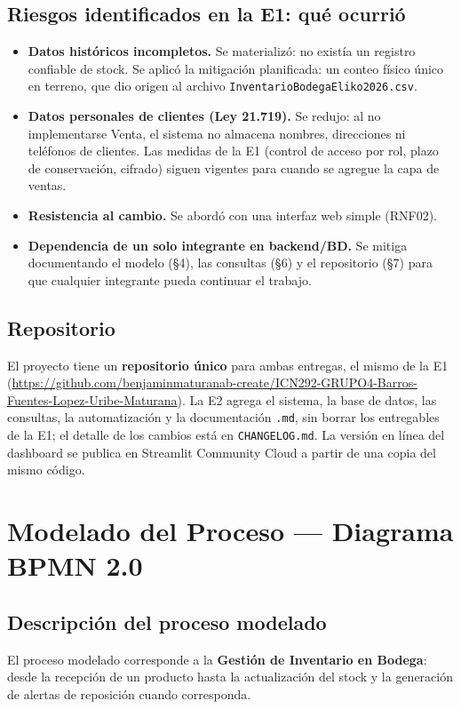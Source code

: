 \documentclass[11pt,letterpaper]{article}
\renewcommand{\_}{\oldus\allowbreak}
\begin{document}
\subsection{Riesgos identificados en la E1: qué ocurrió}
\begin{itemize}
\item \textbf{Datos históricos incompletos.} Se materializó: no existía un registro confiable de stock. Se aplicó la mitigación planificada: un conteo físico único en terreno, que dio origen al archivo \texttt{Inventario\_Bodega\_Eliko\_14\_10\_2026.csv}.
\item \textbf{Datos personales de clientes (Ley 21.719).} Se redujo: al no implementarse Venta, el sistema no almacena nombres, direcciones ni teléfonos de clientes. Las medidas de la E1 (control de acceso por rol, plazo de conservación, cifrado) siguen vigentes para cuando se agregue la capa de ventas.
\item \textbf{Resistencia al cambio.} Se abordó con una interfaz web simple (RNF02).
\item \textbf{Dependencia de un solo integrante en backend/BD.} Se mitiga documentando el modelo (§4), las consultas (§6) y el repositorio (§7) para que cualquier integrante pueda continuar el trabajo.
\end{itemize}

\subsection{Repositorio}
El proyecto tiene un \textbf{repositorio único} para ambas entregas, el mismo de la E1 (\url{https://github.com/benjaminmaturanab-create/ICN292-GRUPO4-Barros-Fuentes-Lopez-Uribe-Maturana}). La E2 agrega el sistema, la base de datos, las consultas, la automatización y la documentación \texttt{.md}, sin borrar los entregables de la E1; el detalle de los cambios está en \texttt{CHANGELOG.md}. La versión en línea del dashboard se publica en Streamlit Community Cloud a partir de una copia del mismo código.

\section{Modelado del Proceso — Diagrama BPMN 2.0}
\subsection{Descripción del proceso modelado}
El proceso modelado corresponde a la \textbf{Gestión de Inventario en Bodega}: desde la recepción de un producto hasta la actualización del stock y la generación de alertas de reposición cuando corresponda.
\end{document}

